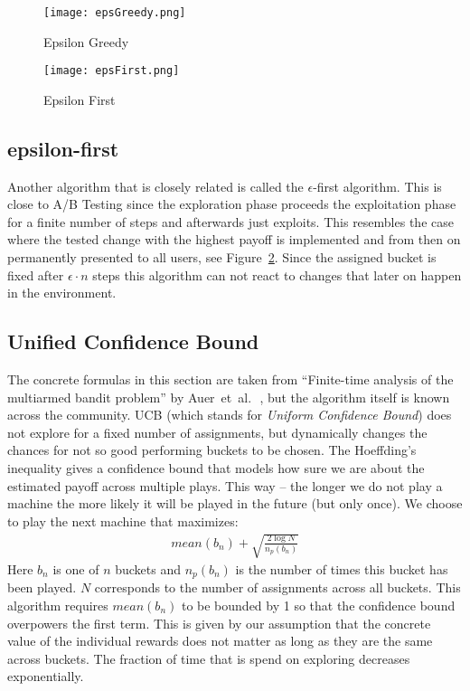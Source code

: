 \documentclass[main.tex]{subfiles}
\begin{document}
\begin{figure}[ht]
\texttt{[image: epsGreedy.png]}
\centering
\caption{Epsilon Greedy}
\label{fig:EpsGreedy}
\end{figure}
\begin{figure}[ht]
\texttt{[image: epsFirst.png]}
\centering
\caption{Epsilon First}
\label{fig:epsFir}
\end{figure}
\clearpage

\subsection{epsilon-first}
Another algorithm that is closely related is called the $\epsilon$-first algorithm. This is close to A/B Testing since the exploration phase proceeds the exploitation phase for a finite number of steps and afterwards just exploits. This resembles the case where the tested change with the highest payoff is implemented and from then on permanently presented to all users, see Figure~\ref{fig:epsFir}. Since the assigned bucket is fixed after $\epsilon \cdot n$ steps this algorithm can not react to changes that later on happen in the environment.

\subsection{Unified Confidence Bound}\label{ssc:ucb}
The concrete formulas in this section are taken from ``Finite-time analysis of the multiarmed bandit problem'' by Auer~et~al.\,~\cite{auer2002finite}, but the algorithm itself is known across the community. UCB (which stands for \emph{Uniform Confidence Bound}) does not explore for a fixed number of assignments, but dynamically changes the chances for not so good performing buckets to be chosen. The Hoeffding's inequality gives a confidence bound that models how sure we are about the estimated payoff across multiple plays. This way -- the longer we do not play a machine the more likely it will be played in the future (but only once). We choose to play the next machine that maximizes:
\begin{align*}
mean(b_n) + \sqrt{\frac{2\log{N}}{n_p(b_n)}}
\end{align*}
Here $b_n$ is one of $n$ buckets and $n_p(b_n)$ is the number of times this bucket has been played. $N$ corresponds to the number of assignments across all buckets. This algorithm requires $mean(b_n)$ to be bounded by 1 so that the confidence bound overpowers the first term. This is given by our assumption that the concrete value of the individual rewards does not matter as long as they are the same across buckets. The fraction of time that is spend on exploring decreases exponentially.
\end{document}
